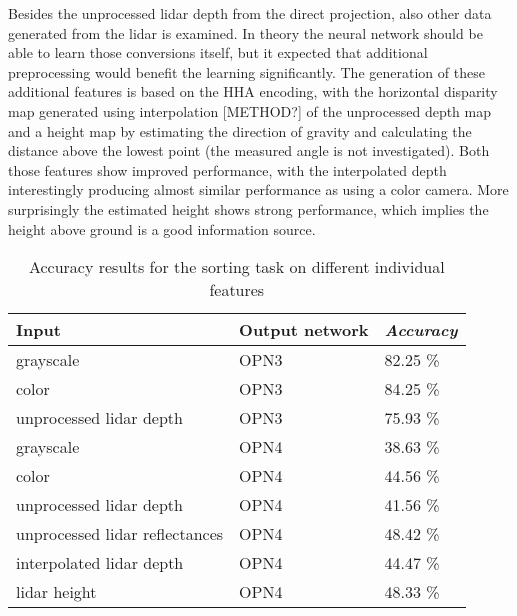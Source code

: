 Besides the unprocessed lidar depth from the direct projection, also other data generated from the lidar is examined. In theory the neural network should be able to learn those  
conversions itself, but it expected that additional preprocessing would benefit the learning significantly. The generation of these additional features is based on the HHA encoding\cite{gupta2013}, with the horizontal disparity map generated using interpolation [METHOD?] of the unprocessed depth map and a height map by estimating the direction of gravity and calculating the distance above the lowest point (the measured angle is not investigated). Both those features show improved performance, with the interpolated depth interestingly producing almost similar performance as using a color camera. More surprisingly the estimated height shows strong performance, which implies the height above ground is a good information source.
\begin{table}[]
\centering
\caption{Accuracy results for the sorting task on different individual features}
\label{tab:indiv_results}
\begin{tabular}{|p{7cm}|p{2cm}|p{2cm}|}
\hline
\textbf{Input}                                                          & \textbf{Output network} & \textit{\textbf{Accuracy}} \\ \hline
grayscale                                                               & OPN3                    & 82.25 \%                   \\ \hline
color                                                                   & OPN3                    & 84.25 \%                   \\ \hline
unprocessed lidar depth                                                 & OPN3                    & 75.93 \%                   \\ \hline
grayscale                                                               & OPN4                    & 38.63 \%                   \\ \hline
color                                                                   & OPN4                    & 44.56 \%                   \\ \hline
unprocessed lidar depth                                                 & OPN4                    & 41.56 \%                   \\ \hline
unprocessed lidar reflectances                                          & OPN4                    & 48.42 \%                   \\ \hline
interpolated lidar depth                                                & OPN4                    & 44.47 \%                   \\ \hline
lidar height                                                            & OPN4                    & 48.33 \%                   \\ \hline
\end{tabular}
\end{table}

